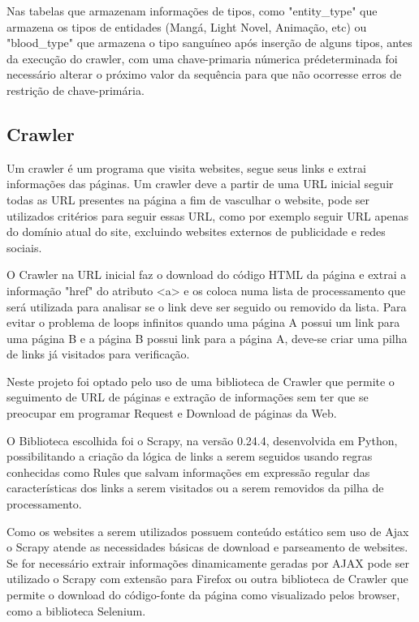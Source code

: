 \documentclass[12pt]{article}
\begin{document}
Nas tabelas que armazenam informações de tipos, como "entity\_type" que armazena os tipos de entidades (Mangá, Light Novel, Animação, etc) ou "blood\_type" que armazena o tipo sanguíneo após inserção de alguns tipos, antes da execução do crawler, com uma chave-primaria númerica prédeterminada foi necessário alterar o próximo valor da sequência para que não ocorresse erros de restrição de chave-primária.  


\subsection{Crawler}

Um crawler é um programa que visita websites, segue seus links e extrai informações das páginas. Um crawler deve a partir de uma URL inicial seguir todas as URL presentes na página a fim de vasculhar o website, 
pode ser utilizados critérios para seguir essas URL, como por exemplo seguir URL apenas do domínio atual do site, excluindo websites externos de publicidade e redes sociais.

O Crawler na URL inicial faz o download do código HTML da página e extrai a informação "href" do atributo <a> e os coloca numa lista de processamento que será utilizada para analisar se o link deve ser seguido ou removido da lista. 
Para evitar o problema de loops infinitos quando uma página A possui um link para uma página B e a página B possui link para a página A, deve-se criar uma pilha de links já visitados para verificação.   
 
Neste projeto foi optado pelo uso de uma biblioteca de Crawler que permite o seguimento de URL de páginas e extração de informações sem ter que se preocupar em programar Request e Download de páginas da Web.

O Biblioteca escolhida foi o Scrapy, na versão 0.24.4, desenvolvida em Python, possibilitando a criação da lógica de links a serem seguidos usando regras conhecidas como Rules que salvam informações em expressão regular das características dos links a serem visitados ou a serem removidos da pilha de processamento.
 
Como os websites a serem utilizados possuem conteúdo estático sem uso de Ajax o Scrapy atende as necessidades básicas de download e parseamento de websites. Se for necessário extrair informações dinamicamente geradas por AJAX pode ser utilizado o Scrapy com extensão para Firefox ou outra biblioteca de Crawler que permite o download do código-fonte da página como visualizado pelos browser, como a biblioteca Selenium.
\end{document}
